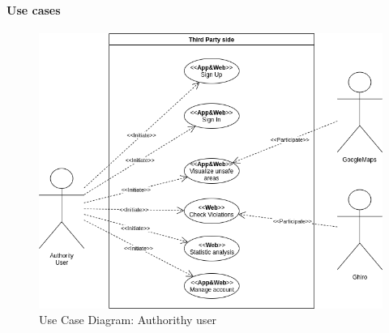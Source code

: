 \documentclass{article}
\begin{document}
\newpage

\paragraph{Use cases}\mbox{}

\begin{figure}[H]
    \centering
    \includegraphics[scale=0.5]{Images/UseCaseThirdPartyView}
    \caption{Use Case Diagram: Authorithy user}
\end{figure}
\end{document}
